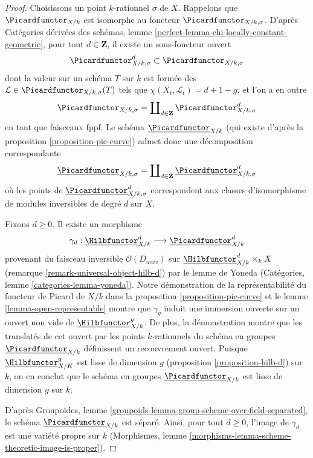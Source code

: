 \begin{proof}
Choisissons un point $k$-rationnel $\sigma$ de $X$. Rappelons que $\Picardfunctor_{X/k}$
est isomorphe au foncteur $\Picardfunctor_{X/k, \sigma}$. D'après
Catégories dérivées des schémas, lemme
\ref{perfect-lemma-chi-locally-constant-geometric},
pour tout $d \in \mathbf{Z}$, il existe un sous-foncteur ouvert
$$
\Picardfunctor^d_{X/k, \sigma} \subset \Picardfunctor_{X/k, \sigma}
$$
dont la valeur sur un schéma $T$ sur $k$ est formée des
$\mathcal{L} \in \Picardfunctor_{X/k, \sigma}(T)$ tels que
$\chi(X_t, \mathcal{L}_t) = d + 1 - g$, et l'on a en outre
$$
\Picardfunctor_{X/k, \sigma} =
\coprod\nolimits_{d \in \mathbf{Z}} \Picardfunctor^d_{X/k, \sigma}
$$
en tant que faisceaux fppf. Le schéma $\underline{\Picardfunctor}_{X/k}$
(qui existe d'après la proposition \ref{proposition-pic-curve})
admet donc une décomposition correspondante
$$
\underline{\Picardfunctor}_{X/k, \sigma} =
\coprod\nolimits_{d \in \mathbf{Z}} \underline{\Picardfunctor}^d_{X/k, \sigma}
$$
où les points de $\underline{\Picardfunctor}^d_{X/k, \sigma}$ correspondent
aux classes d'isomorphisme de modules inversibles de degré $d$ sur $X$.

\medskip\noindent
Fixons $d \geq 0$. Il existe un morphisme
$$
\gamma_d :
\underline{\Hilbfunctor}^d_{X/k}
\longrightarrow
\underline{\Picardfunctor}^d_{X/k}
$$
provenant du faisceau inversible $\mathcal{O}(D_{univ})$ sur
$\underline{\Hilbfunctor}^d_{X/k} \times_k X$
(remarque \ref{remark-universal-object-hilb-d}) par le lemme de Yoneda
(Catégories, lemme \ref{categories-lemma-yoneda}).
Notre démonstration de la représentabilité du foncteur de Picard de $X/k$
dans la proposition \ref{proposition-pic-curve} et le
lemme \ref{lemma-open-representable} montre que $\gamma_g$
induit une immersion ouverte sur un ouvert non vide de
$\underline{\Hilbfunctor}^g_{X/k}$. De plus, la démonstration montre
que les translatés de cet ouvert par les points $k$-rationnels du
schéma en groupes $\underline{\Picardfunctor}_{X/k}$ définissent
un recouvrement ouvert. Puisque
$\underline{\Hilbfunctor}^g_{X/K}$ est lisse de dimension $g$
(proposition \ref{proposition-hilb-d})
sur $k$, on en conclut que le
schéma en groupes $\underline{\Picardfunctor}_{X/k}$ est lisse de dimension $g$
sur $k$.

\medskip\noindent
D'après Groupoïdes, lemme \ref{groupoids-lemma-group-scheme-over-field-separated},
le schéma $\underline{\Picardfunctor}_{X/k}$ est séparé.
Ainsi, pour tout $d \geq 0$, l'image de $\gamma_d$
est une variété propre sur $k$
(Morphismes, lemme \ref{morphisms-lemma-scheme-theoretic-image-is-proper}).


\end{proof}
